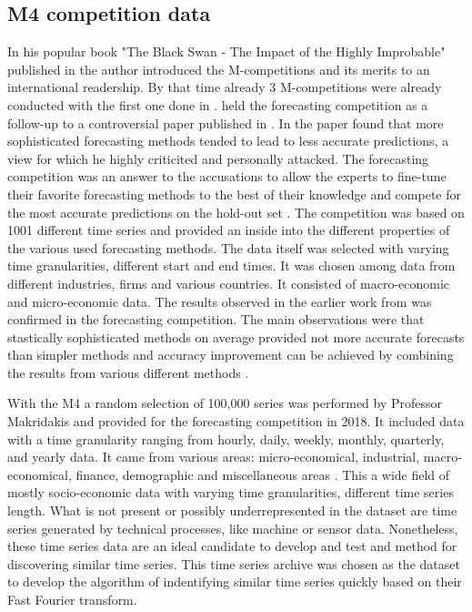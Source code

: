 \documentclass[phd,black, hidelinks]{PrincetonThesis}
\begin{document}
\subsection{M4 competition data}
\label{sec:orge8e33b8}
\label{org44d15b1}
In his popular book "The Black Swan - The Impact of the Highly Improbable" published in \citeyear{taleb2008black} the author \citeauthor{taleb2008black} introduced the M-competitions and its merits to an international readership. By that time already 3 M-competitions were already conducted with the first one done in \citeyear{makridakis1982}. \citeauthor{makridakis1982} held the forecasting competition as a follow-up to a controversial paper published in \citeyear{makridakis1979}. In the paper \citeauthor{makridakis1979} found that more sophisticated forecasting methods tended to lead to less accurate predictions, a view for which he highly criticited and personally attacked. The forecasting competition was an answer to the accusations to allow the experts to fine-tune their favorite forecasting methods to the best of their knowledge and compete for the most accurate predictions on the hold-out set \cite{makridakis1982}. The competition was based on 1001 different time series and provided an inside into the different properties of the various used forecasting methods. The data itself was selected with varying time granularities, different start and end times. It was chosen among data from different industries, firms and various countries. It consisted of macro-economic and micro-economic data. The results observed in the earlier work from \citeyear{makridakis1979} was confirmed in the forecasting competition. The main observations were that stastically sophisticated methods on average provided not more accurate forecasts than simpler methods and accuracy improvement can be achieved by combining the results from various different methods \cite{hyndman2020}.

With the M4 a random selection of 100,000 series was performed by Professor Makridakis and provided for the forecasting competition in 2018. It included data with a time granularity ranging from hourly, daily, weekly, monthly, quarterly, and yearly data. It came from various areas: micro-economical, industrial, macro-economical, finance, demographic and miscellaneous areas \cite{makridakis2020}. This a wide field of mostly socio-economic data with varying time granularities, different time series length. What is not present or possibly underrepresented in the dataset are time series generated by technical processes, like machine or sensor data. Nonetheless, these time series data are an ideal candidate to develop and test and method for discovering similar time series. This time series archive was chosen as the dataset to develop the algorithm of indentifying similar time series quickly based on their Fast Fourier transform.
\end{document}
